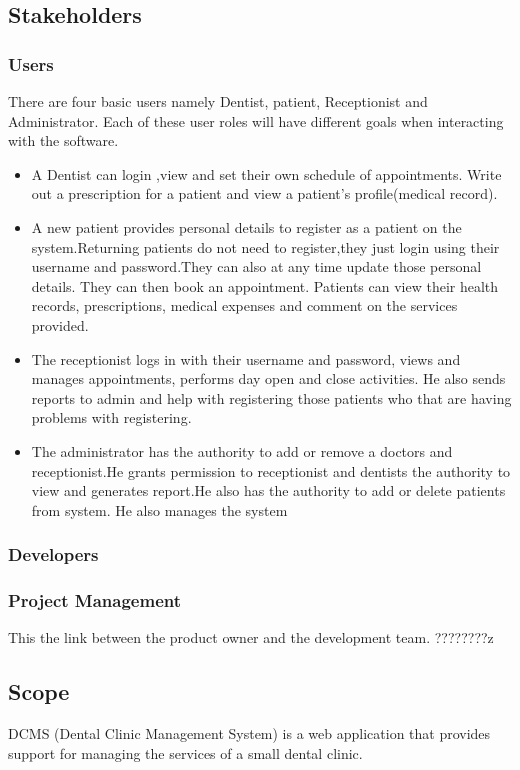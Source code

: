 \documentclass[11 pt]{article}
\begin{document}
\subsection{Stakeholders}
\subsubsection{Users}
There are four basic users namely Dentist, patient, Receptionist and Administrator. Each of these user roles will have different goals when interacting with the software.
\begin{itemize}
\item
A Dentist can login ,view and set their own schedule of appointments. Write out a prescription for a patient and view a patient's profile(medical record).
\item
A new patient provides personal details to register as a patient on the system.Returning patients do not need to register,they just login using their username and password.They can also at any time update those personal details. They can then book an appointment. Patients can view their health  records, prescriptions, medical expenses and comment on the services provided.
\item
The receptionist logs in with their username and password, views and manages  appointments, performs day open and close activities. He also sends reports to admin and help with registering those patients who that are having problems with registering.
\item
The administrator has the authority to add or remove a doctors and receptionist.He grants permission to receptionist  and  dentists the authority to view and generates report.He also has the authority to add or delete patients from system. He also manages the system
\end{itemize}
\subsubsection{Developers}
\subsubsection{Project Management}
This the link between the product owner and the development team. ????????z 
\subsection{Scope}
DCMS (Dental Clinic Management System) is a web application that provides support for managing the services of a small dental clinic.
\end{document}
